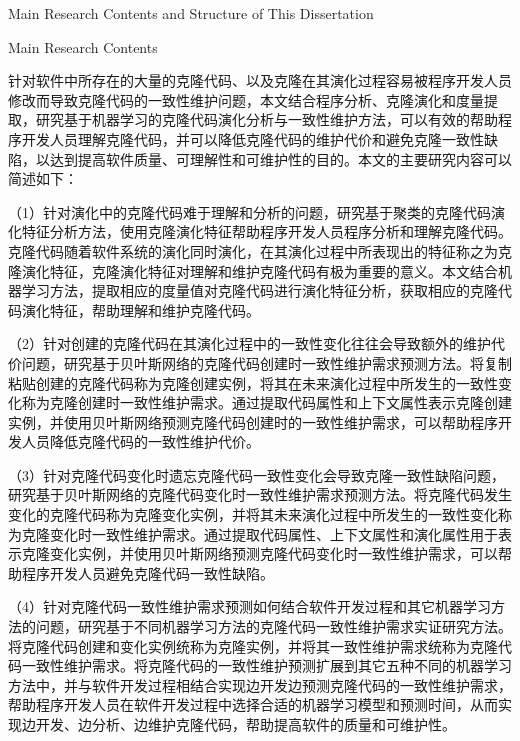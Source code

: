 {Main Research Contents and Structure of This Dissertation}

{Main Research Contents}

针对软件中所存在的大量的克隆代码、以及克隆在其演化过程容易被程序开发人员修改而导致克隆代码的一致性维护问题，本文结合程序分析、克隆演化和度量提取，研究基于机器学习的克隆代码演化分析与一致性维护方法，可以有效的帮助程序开发人员理解克隆代码，并可以降低克隆代码的维护代价和避免克隆一致性缺陷，以达到提高软件质量、可理解性和可维护性的目的。本文的主要研究内容可以简述如下：

（1）针对演化中的克隆代码难于理解和分析的问题，研究基于聚类的克隆代码演化特征分析方法，使用克隆演化特征帮助程序开发人员程序分析和理解克隆代码。克隆代码随着软件系统的演化同时演化，在其演化过程中所表现出的特征称之为克隆演化特征，克隆演化特征对理解和维护克隆代码有极为重要的意义。本文结合机器学习方法，提取相应的度量值对克隆代码进行演化特征分析，获取相应的克隆代码演化特征，帮助理解和维护克隆代码。

（2）针对创建的克隆代码在其演化过程中的一致性变化往往会导致额外的维护代价问题，研究基于贝叶斯网络的克隆代码创建时一致性维护需求预测方法。将复制粘贴创建的克隆代码称为克隆创建实例，将其在未来演化过程中所发生的一致性变化称为克隆创建时一致性维护需求。通过提取代码属性和上下文属性表示克隆创建实例，并使用贝叶斯网络预测克隆代码创建时的一致性维护需求，可以帮助程序开发人员降低克隆代码的一致性维护代价。

（3）针对克隆代码变化时遗忘克隆代码一致性变化会导致克隆一致性缺陷问题，研究基于贝叶斯网络的克隆代码变化时一致性维护需求预测方法。将克隆代码发生变化的克隆代码称为克隆变化实例，并将其未来演化过程中所发生的一致性变化称为克隆变化时一致性维护需求。通过提取代码属性、上下文属性和演化属性用于表示克隆变化实例，并使用贝叶斯网络预测克隆代码变化时一致性维护需求，可以帮助程序开发人员避免克隆代码一致性缺陷。


（4）针对克隆代码一致性维护需求预测如何结合软件开发过程和其它机器学习方法的问题，研究基于不同机器学习方法的克隆代码一致性维护需求实证研究方法。将克隆代码创建和变化实例统称为克隆实例，并将其一致性维护需求统称为克隆代码一致性维护需求。将克隆代码的一致性维护预测扩展到其它五种不同的机器学习方法中，并与软件开发过程相结合实现边开发边预测克隆代码的一致性维护需求，帮助程序开发人员在软件开发过程中选择合适的机器学习模型和预测时间，从而实现边开发、边分析、边维护克隆代码，帮助提高软件的质量和可维护性。%

